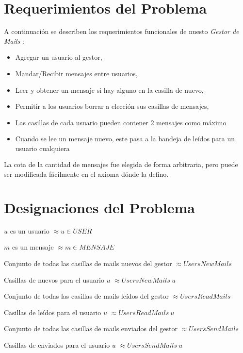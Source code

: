 \newcommand{\desig}[2]{\item #1 $\approx #2$}
\newenvironment{designations}
  {\begin{leftbar}
    \begin{list}{}{\setlength{\labelsep}{0cm}
                   \setlength{\labelwidth}{0cm}
                   \setlength{\listparindent}{0cm}
                   \setlength{\rightmargin}{\leftmargin}}}
  {\end{list}\end{leftbar}}

\newcommand{\setlog}{$\{log\}$\xspace}

\section{Requerimientos del Problema}
A continuación se describen los requerimientos funcionales de nuesto \textit{Gestor de Mails} : 
\begin{itemize}
    \item Agregar un usuario al gestor,
    \item Mandar/Recibir mensajes entre usuarios,
    \item Leer y obtener un mensaje si hay alguno en la casilla de nuevo,
    \item Permitir a los usuarios borrar a elección sus casillas de mensajes,  
    \item Las casillas de cada usuario pueden contener 2 mensajes como máximo
    \item Cuando se lee un mensaje nuevo, este pasa a la bandeja de leídos para un usuario cualquiera
\end{itemize}

La cota de la cantidad de mensajes fue elegida de forma arbitraria, pero puede ser modificada fácilmente en el axioma dónde la defino.

\section{Designaciones del Problema}

\begin{designations}
\desig{$u$ es un usuario}{u \in USER}
\desig{$m$ es un mensaje}{m \in MENSAJE}
\desig{Conjunto de todas las casillas de mails nuevos del gestor}{UsersNewMails}
\desig{Casillas de nuevos para el usuario $u$}{UsersNewMails\ u}

\desig{Conjunto de todas las casillas de mails leídos del gestor}{UsersReadMails}
\desig{Casillas de leídos para el usuario $u$}{UsersReadMails\ u}

\desig{Conjunto de todas las casillas de mails enviados del gestor}{UsersSendMails}
\desig{Casillas de enviados para el usuario $u$}{UsersSendMails\ u}
\end{designations}

